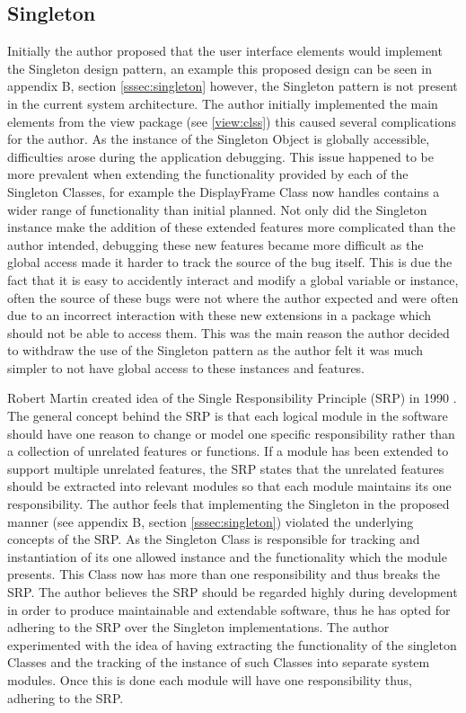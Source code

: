 \subsection{Singleton}

Initially the author proposed that the user interface elements would implement the Singleton design pattern\cite{gof:design:singleton}, an example this proposed design can be seen in appendix B, section \ref{sssec:singleton} however, the Singleton pattern is not present in the current system architecture. The author initially implemented the main elements from the view package (see \ref{view:clss}) this caused several complications for the author. As the instance of the Singleton Object is globally accessible, difficulties arose during the application debugging. This issue happened to be more prevalent when extending the functionality provided by each of the Singleton Classes, for example the DisplayFrame Class now handles contains a wider range of functionality than initial planned. Not only did the Singleton instance make the addition of these extended features more complicated than the author intended, debugging these new features became more difficult as the global access made it harder to track the source of the bug itself. This is due the fact that it is easy to accidently interact and modify a global variable or instance, often the source of these bugs were not where the author expected and were often due to an incorrect interaction with these new extensions in a package which should not be able to access them. This was the main reason the author decided to withdraw the use of the Singleton pattern as the author felt it was much simpler to not have global access to these instances and features.

Robert Martin created idea of the Single Responsibility Principle (SRP) in 1990 \cite{SRP:site}. The general concept behind the SRP is that each logical module in the software should have one reason to change or model one specific responsibility rather than a collection of unrelated features or functions. If a module has been extended to support multiple unrelated features, the SRP states that the unrelated features should be extracted into relevant modules so that each module maintains its one responsibility. The author feels that implementing the Singleton in the proposed manner (see appendix B, section \ref{sssec:singleton}) violated the underlying concepts of the SRP. As the Singleton Class is responsible for tracking and instantiation of its one allowed instance and the functionality which the module presents. This Class now has more than one responsibility and thus breaks the SRP. The author believes the SRP should be regarded highly during development in order to produce maintainable and extendable software, thus he has opted for adhering to the SRP over the Singleton implementations. The author experimented with the idea of having extracting the functionality of the singleton Classes and the tracking of the instance of such Classes into separate system modules. Once this is done each module will have one responsibility thus, adhering to the SRP. 


